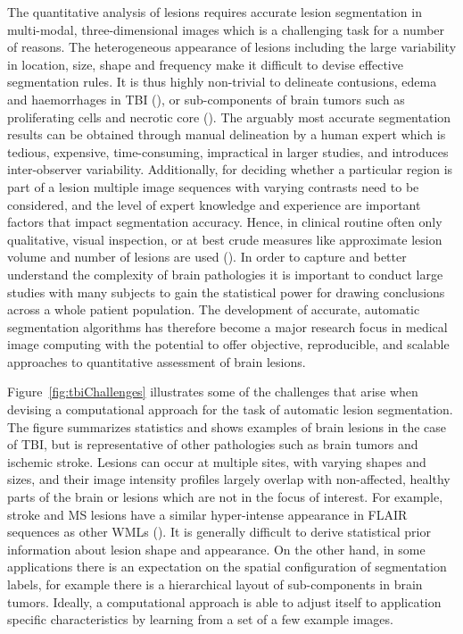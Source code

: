 \documentclass[preprint,authoryear,12pt]{elsarticle}
\begin{document}
The quantitative analysis of lesions requires accurate lesion segmentation in multi-modal, three-dimensional images which is a challenging task for a number of reasons. The heterogeneous appearance of lesions including the large variability in location, size, shape and frequency make it difficult to devise effective segmentation rules.
It is thus highly non-trivial to delineate contusions, edema and haemorrhages in TBI (\cite{Irimia2012a}), or sub-components of brain tumors such as proliferating cells and necrotic core (\cite{Menze2014}). The arguably most accurate segmentation results can be obtained through manual delineation by a human expert which is tedious, expensive, time-consuming, impractical in larger studies, and introduces inter-observer variability. Additionally, for deciding whether a particular region is part of a lesion multiple image sequences with varying contrasts need to be considered, and the level of expert knowledge and experience are important factors that impact segmentation accuracy. Hence, in clinical routine often only qualitative, visual inspection, or at best crude measures like approximate lesion volume and number of lesions are used (\cite{Yuh2012,Wen2010}). In order to capture and better understand the complexity of brain pathologies it is important to conduct large studies with many subjects to gain the statistical power for drawing conclusions across a whole patient population. The development of accurate, automatic segmentation algorithms has therefore become a major research focus in medical image computing with the potential to offer objective, reproducible, and scalable approaches to quantitative assessment of brain lesions.

Figure~\ref{fig:tbiChallenges} illustrates some of the challenges that arise when devising a computational approach for the task of automatic lesion segmentation. The figure summarizes statistics and shows examples of brain lesions in the case of TBI, but is representative of other pathologies such as brain tumors and ischemic stroke. Lesions can occur at multiple sites, with varying shapes and sizes, and their image intensity profiles largely overlap with non-affected, healthy parts of the brain or lesions which are not in the focus of interest. For example, stroke and MS lesions have a similar hyper-intense appearance in FLAIR sequences as other WMLs (\cite{Mitra2014, Schmidt2012}). It is generally difficult to derive statistical prior information about lesion shape and appearance. On the other hand, in some applications there is an expectation on the spatial configuration of segmentation labels, for example there is a hierarchical layout of sub-components in brain tumors. Ideally, a computational approach is able to adjust itself to application specific characteristics by learning from a set of a few example images.
\end{document}
